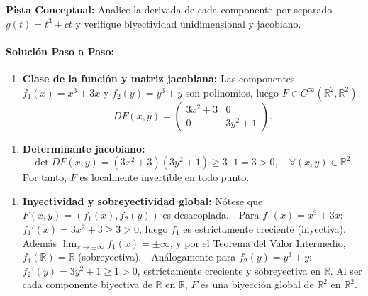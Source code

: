 \documentclass[11pt,a4paper]{article}
\begin{document}
\begin{tcolorbox}[colback=yellow!4,colframe=accentamber!70,arc=1mm,boxrule=0.5pt,left=3mm,right=3mm,top=1.5mm,bottom=1.5mm]
\textbf{Pista Conceptual:} Analice la derivada de cada componente por separado $g(t) = t^3 + ct$ y verifique biyectividad unidimensional y jacobiano.
\end{tcolorbox}

\paragraph{Solución Paso a Paso:}\par
\begin{enumerate}[label=\textbf{\arabic*.}]
\item \textbf{Clase de la función y matriz jacobiana:}
Las componentes $f_1(x) = x^3 + 3x$ y $f_2(y) = y^3 + y$ son polinomios, luego $F \in C^\infty(\mathbb{R}^2, \mathbb{R}^2)$.
\begin{equation*}
DF(x,y) = \begin{pmatrix} 3x^2 + 3 & 0 \\ 0 & 3y^2 + 1 \end{pmatrix}.
\end{equation*}
\end{enumerate}

\begin{enumerate}[label=\textbf{\arabic*.}]
\item \textbf{Determinante jacobiano:}
\begin{equation*}
\det DF(x,y) = (3x^2 + 3)(3y^2 + 1) \ge 3 \cdot 1 = 3 > 0, \quad \forall (x,y) \in \mathbb{R}^2.
\end{equation*}
Por tanto, $F$ es localmente invertible en todo punto.
\end{enumerate}

\begin{enumerate}[label=\textbf{\arabic*.}]
\item \textbf{Inyectividad y sobreyectividad global:}
Nótese que $F(x,y) = (f_1(x), f_2(y))$ es desacoplada.
- Para $f_1(x) = x^3 + 3x$: $f_1'(x) = 3x^2 + 3 \ge 3 > 0$, luego $f_1$ es estrictamente creciente (inyectiva). Además $\lim_{x \to \pm\infty} f_1(x) = \pm\infty$, y por el Teorema del Valor Intermedio, $f_1(\mathbb{R}) = \mathbb{R}$ (sobreyectiva).
- Análogamente para $f_2(y) = y^3 + y$: $f_2'(y) = 3y^2 + 1 \ge 1 > 0$, estrictamente creciente y sobreyectiva en $\mathbb{R}$.
Al ser cada componente biyectiva de $\mathbb{R}$ en $\mathbb{R}$, $F$ es una biyección global de $\mathbb{R}^2$ en $\mathbb{R}^2$.
\end{enumerate}
\end{document}

